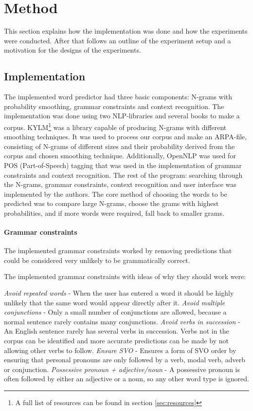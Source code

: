 \section{Method}
This section explains how the implementation was done and how the experiments were conducted. After that follows an outline of the experiment setup and a motivation for the designs of the experiments.
\subsection{Implementation}
The implemented word predictor had three basic components: N-grams with probability smoothing, grammar constraints and context recognition. The implementation was done using two NLP-libraries and several books to make a corpus. KYLM\footnote{A full list of resources can be found in section \ref{sec:resources}} was a library capable of producing N-grams with different smoothing techniques. It was used to process our corpus and make an ARPA-file, consisting of N-grams of different sizes and their probability derived from the corpus and chosen smoothing technique. Additionally, OpenNLP was used for POS (Part-of-Speech) tagging that was used in the implementation of grammar constraints and context recognition. The rest of the program: searching through the N-grams, grammar constraints, context recognition and user interface was implemented by the authors. The core method of choosing the words to be predicted was to compare large N-grams, choose the grams with highest probabilities, and if more words were required, fall back to smaller grams.

\paragraph{Grammar constraints}
The implemented grammar constraints worked by removing predictions that could be considered very unlikely to be grammatically correct.

The implemented grammar constraints with ideas of why they should work were:

\emph{Avoid repeated words} - When the user has entered a word it should be highly unlikely that the same word would appear directly after it.
\emph{Avoid multiple conjunctions} - Only a small number of conjunctions are allowed, because a normal sentence rarely contains many conjunctions.
\emph{Avoid verbs in succession} - An English sentence rarely has several verbs in succession. Verbs not in the corpus can be identified and more accurate predictions can be made by not allowing other verbs to follow.
\emph{Ensure SVO} - Ensures a form of SVO order by ensuring that personal pronouns are only followed by a verb, modal verb, adverb or conjunction.
\emph{Possessive pronoun + adjective/noun} - A possessive pronoun is often followed by either an adjective or a noun, so any other word type is ignored.

